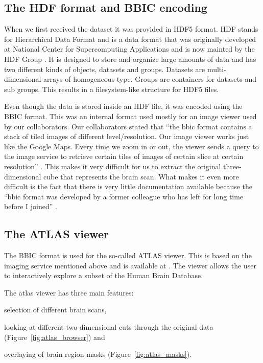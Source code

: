 \subsection{The HDF format and BBIC encoding}

When we first received the dataset it was provided in HDF5 format. HDF stands for Hierarchical Data Format and is a data format that was originally developed at National Center for Supercomputing Applications  and is now mainted by the HDF Group \cite{HDF5:website}. It is designed to store and organize large amounts of data and has two different kinds of objects, datasets and groups. Datasets are multi-dimensional arrays of homogeneous type. Groups are containers for datasets and sub groups. This results in a filesystem-like structure for HDF5 files. 

Even though the data is stored inside an HDF file, it was encoded using the BBIC format. This was an internal format used mostly for an image viewer used by our collaborators. Our collaborators stated that ``the bbic format contains a stack of tiled images of different level/resolution. Our image viewer works just like the Google Maps. Every time we zoom in or out, the viewer sends a query to the image service to retrieve certain tiles of images of certain slice at certain resolution'' \cite{BBIC:about}. This makes it very difficult for us to extract the original three-dimensional cube that represents the brain scan. What makes it even more difficult is the fact that there is very little documentation available because the  ``bbic format was developed by a former colleague who has left for long time before I joined'' \cite{BBIC:dev}.

\subsection{The ATLAS viewer}

The BBIC format is used for the so-called ATLAS viewer. This is based on the imaging service mentioned above and is available at \cite{hbp:atlasviewer}. The viewer allows the user to interactively explore a subset of the Human Brain Database. 

The atlas viewer has three main features: 
\begin{inparaenum}[(1)]
\item selection of different brain scans, 
\item looking at different two-dimensional cuts through the original data (Figure~\ref{fig:atlas_browser}) and
\item overlaying of brain region masks (Figure~\ref{fig:atlas_masks}). 
\end{inparaenum}

